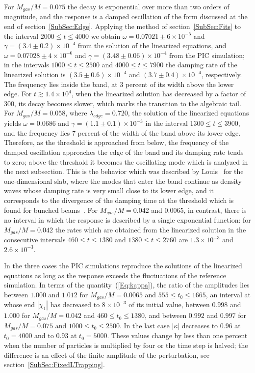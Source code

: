 For $M_{gas}/M = 0.075$ the decay is exponential over more than two orders of magnitude, and the response is a damped oscillation of the form discussed at the end of section~\ref{SubSec:Edge}. Applying the method of section~\ref{SubSec:Fits} to the interval $2000\leq t\leq 4000$ we obtain $\omega = 0.07021\pm 6\times 10^{-5}$ and $\gamma = (3.4\pm 0.2)\times 10^{-4}$ from the solution of the linearized equations, and $\omega = 0.07028\pm 4\times 10^{-6}$ and $\gamma = (3.48\pm 0.06)\times 10^{-4}$ from the PIC simulation; in the intervals $1000\leq t\leq 2500$ and $4000\leq t\leq 7900$ the damping rate of the linearized solution is $(3.5\pm 0.6)\times 10^{-4}$ and $(3.7\pm 0.4)\times 10^{-4}$, respectively. The frequency lies inside the band, at $3$ percent of its width above the lower edge. For $t\gtrsim 1.4\times 10^4$, when the linearized solution has decreased by a factor of $300$, its decay becomes slower, which marks the transition to the algebraic tail. For $M_{gas}/M = 0.058$, where $\lambda_{edge} = 0.720$, the solution of the linearized equations yields $\omega = 0.0686$ and $\gamma = (1.1\pm 0.1)\times 10^{-3}$ in the interval $1300\leq t\leq 3900$, and the frequency lies $7$ percent of the width of the band above its lower edge. Therefore, as the threshold is approached from below, the frequency of the damped oscillation approaches the edge of the band and its damping rate tends to zero; above the threshold it becomes the oscillating mode which is analyzed in the next subsection. This is the behavior which was described by Louis~\cite{pL92} for the one-dimensional slab, where the modes that enter the band continue as density waves whose damping rate is very small close to its lower edge, and it corresponds to the divergence of the damping time at the threshold which is found for bunched beams~\cite{iKtAeS21}. For $M_{gas}/M = 0.042$ and $0.0065$, in contrast, there is no interval in which the response is described by a single exponential function: for $M_{gas}/M = 0.042$ the rates which are obtained from the linearized solution in the consecutive intervals $460\leq t\leq 1380$ and $1380\leq t\leq 2760$ are $1.3\times 10^{-3}$ and $2.6\times 10^{-3}$.

In the three cases the PIC simulations reproduce the solutions of the linearized equations as long as the response exceeds the fluctuations of the reference simulation. In terms of the quantity~(\ref{Eq:kappa}), the ratio of the amplitudes lies between $1.000$ and $1.012$ for $M_{gas}/M = 0.0065$ and $555\leq t_0\leq 1665$, an interval at whose end $|\chi_1|$ has decreased to $8\times 10^{-3}$ of its initial value, between $0.998$ and $1.000$ for $M_{gas}/M = 0.042$ and $460\leq t_0\leq 1380$, and between $0.992$ and $0.997$ for $M_{gas}/M = 0.075$ and $1000\leq t_0\leq 2500$. In the last case $|\kappa|$ decreases to $0.96$ at $t_0 = 4000$ and to $0.93$ at $t_0 = 5000$. These values change by less than one percent when the number of particles is multiplied by four or the time step is halved; the difference is an effect of the finite amplitude of the perturbation, see section~\ref{SubSec:FixedLTrapping}.

